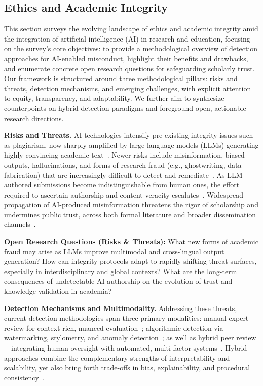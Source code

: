 \documentclass[sigconf]{acmart}
\begin{document}
\subsection{Ethics and Academic Integrity}

This section surveys the evolving landscape of ethics and academic integrity amid the integration of artificial intelligence (AI) in research and education, focusing on the survey's core objectives: to provide a methodological overview of detection approaches for AI-enabled misconduct, highlight their benefits and drawbacks, and enumerate concrete open research questions for safeguarding scholarly trust. Our framework is structured around three methodological pillars: risks and threats, detection mechanisms, and emerging challenges, with explicit attention to equity, transparency, and adaptability. We further aim to synthesize counterpoints on hybrid detection paradigms and foreground open, actionable research directions.

\textbf{Risks and Threats.}
AI technologies intensify pre-existing integrity issues such as plagiarism, now sharply amplified by large language models (LLMs) generating highly convincing academic text~\cite{ref2,ref24,ref53,ref81,ref90,ref92,ref95,ref97}. Newer risks include misinformation, biased outputs, hallucinations, and forms of research fraud (e.g., ghostwriting, data fabrication) that are increasingly difficult to detect and remediate~\cite{ref4,ref9,ref14,ref39,ref40,ref45,ref66,ref70,ref76,ref80,ref84,ref86,ref91,ref93,ref109}. As LLM-authored submissions become indistinguishable from human ones, the effort required to ascertain authorship and content veracity escalates~\cite{ref14,ref24,ref80,ref85,ref92,ref97,ref110}. Widespread propagation of AI-produced misinformation threatens the rigor of scholarship and undermines public trust, across both formal literature and broader dissemination channels~\cite{ref15,ref39,ref41,ref64,ref85,ref98}.

\textbf{Open Research Questions (Risks \& Threats):}
What new forms of academic fraud may arise as LLMs improve multimodal and cross-lingual output generation?
How can integrity protocols adapt to rapidly shifting threat surfaces, especially in interdisciplinary and global contexts?
What are the long-term consequences of undetectable AI authorship on the evolution of trust and knowledge validation in academia?

\textbf{Detection Mechanisms and Multimodality.}
Addressing these threats, current detection methodologies span three primary modalities: manual expert review for context-rich, nuanced evaluation~\cite{ref2,ref23,ref82,ref86,ref97}; algorithmic detection via watermarking, stylometry, and anomaly detection~\cite{ref10,ref14,ref41,ref53,ref83,ref84,ref85,ref86,ref91,ref92,ref95,ref96,ref97,ref98,ref100,ref109,ref110}; as well as hybrid peer review—integrating human oversight with automated, multi-factor systems~\cite{ref84,ref85,ref95,ref97,ref100}. Hybrid approaches combine the complementary strengths of interpretability and scalability, yet also bring forth trade-offs in bias, explainability, and procedural consistency~\cite{ref14,ref41,ref80,ref85,ref92,ref97,ref100}.
\end{document}
